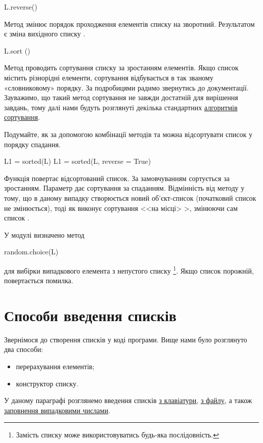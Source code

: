 \begin{pydef}
L.reverse()
\end{pydef}

Метод  змінює порядок проходження елементів списку на зворотний. Результатом є зміна вихідного списку .

\begin{pydef}
L.sort ()
\end{pydef}

Метод  проводить сортування списку за зростанням елементів. Якщо список містить різнорідні елементи, сортування відбувається в так званому «словниковому» порядку. За подробицями радимо звернутись до документації. Зауважимо, що такий метод сортування не завжди достатній для вирішення завдань, тому далі нами будуть розглянуті декілька стандартних \hyperref [sort]{алгоритмів сортування}.

Подумайте, як за допомогою комбінації методів  та  можна відсортувати список у порядку спадання.

\begin{pydef}
L1 = sorted(L)
L1 = sorted(L, reverse = True)
\end{pydef}

Функція  повертає відсортований список. За замовчуванням сортується за зростанням. Параметр  дає сортування за спаданням. Відмінність від методу  у тому, що в даному випадку створюється новий об'єкт-список (початковий список  не змінюється), тоді як  виконує сортування <<на місці> >, змінюючи сам список .

У модулі  визначено метод
\begin{pydef}
random.choice(L)
\end{pydef}
\noindent для вибірки випадкового елемента з непустого списку \footnote{Замість списку може використовуватись будь-яка послідовність.}. Якщо список  порожній, повертається помилка.


\section{Способи введення списків}\label{listinput}

Звернімося до створення списків у коді програми. Вище нами було розглянуто два способи:
\begin{itemize}
\item перерахування елементів;
\item конструктор списку.
\end{itemize}
У даному параграфі розглянемо введення списків \hyperref [inkeyb]{з клавіатури}, \hyperref [infile]{з файлу}, а також \hyperref [inrand]{заповнення випадковими числами}.

